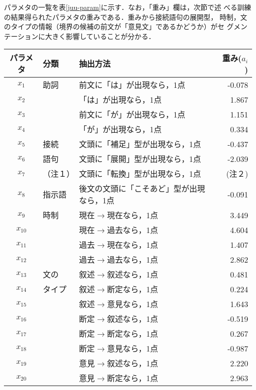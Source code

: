 パラメタの一覧を表\ref{juu-param}に示す．なお，「重み」欄は，次節で述
べる訓練の結果得られたパラメタの重みである．重みから接続語句の展開型，
時制，文のタイプの情報（境界の候補の前文が「意見文」であるかどうか）がセ
グメンテーションに大きく影響していることが分かる．
\begin{table}[htb]
  \begin{center}
    \begin{tabular}{|c|l|l||r|} \hline
 パラメタ & 分類	& 抽出方法 & 重み($a_i$)\\
 \hline \hline
      $x_1$ & 助詞	& 前文に「は」が出現なら，1点 & -0.078 \\
      $x_2$ & 	& 「は」が出現なら，1点 & 1.867 \\
      $x_3$ & 	& 前文に「が」が出現なら，1点 & 1.151 \\
      $x_4$ & 	& 「が」が出現なら，1点 & 0.334 \\ \hline
      $x_5$ & 接続	& 文頭に「補足」型が出現なら，1点 & -0.437 \\
      $x_6$ & 語句	& 文頭に「展開」型が出現なら，1点 & -2.039 \\
      $x_7$ & （注１）	& 文頭に「転換」型が出現なら，1点 & (注２) \\ \hline
      $x_8$ & 指示語	& 後文の文頭に「こそあど」型が出現なら，1点 & -0.091 \\ \hline
     $x_9$ & 時制	& 現在$\rightarrow$現在なら，1点 & 3.449 \\
     $x_{10}$ & 	& 現在$\rightarrow$過去なら，1点 & 4.604 \\
     $x_{11}$ & 	& 過去$\rightarrow$現在なら，1点 & 1.407 \\
     $x_{12}$ & 	& 過去$\rightarrow$過去なら，1点 & 2.862 \\ \hline
     $x_{13}$ & 文の	& 叙述$\rightarrow$叙述なら，1点 & 0.481 \\
     $x_{14}$ & タイプ	& 叙述$\rightarrow$断定なら，1点 & 0.224 \\
     $x_{15}$ & 	& 叙述$\rightarrow$意見なら，1点 & 1.643 \\
     $x_{16}$ & 	& 断定$\rightarrow$叙述なら，1点 & -0.519 \\ 
     $x_{17}$ & 	& 断定$\rightarrow$断定なら，1点 & 0.267 \\ 
     $x_{18}$ & 	& 断定$\rightarrow$意見なら，1点 & -0.987 \\ 
     $x_{19}$ & 	& 意見$\rightarrow$叙述なら，1点 & 2.220 \\ 
     $x_{20}$ & 	& 意見$\rightarrow$断定なら，1点 & 2.963 \\ 

\end{tabular}
\end{center}
\end{table}
